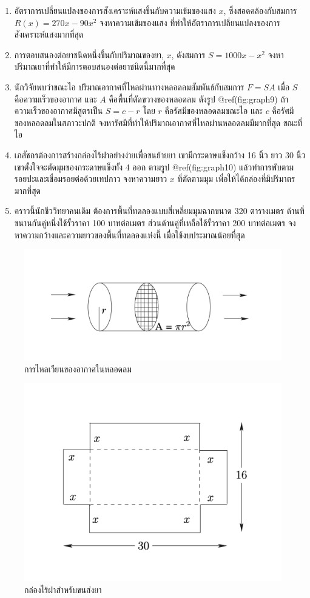 \documentclass[
]{book}
\begin{document}
\begin{enumerate}
\def\labelenumi{\arabic{enumi}.}
\item
  อัตราการเปลี่ยนแปลงของการสังเคราะห์แสงขึ้นกับความเข้มของแสง \(x\),
  ซึ่งสอดคล้องกับสมการ \(R(x)=270x-90x^2\) จงหาความเข้มของแสง
  ที่ทำให้อัตราการเปลี่ยนแปลงของการสังเคราะห์แสงมากที่สุด
\item
  การตอบสนองต่อยาชนิดหนึ่งขึ้นกับปริมาณของยา, \(x\), ดังสมการ \(S=1000x-x^2\)
  จงหาปริมาณยาที่ทำให้มีการตอบสนองต่อยาชนิดนี้มากที่สุด
\item
  นักวิจัยพบว่าขณะไอ ปริมาณอากาศที่ไหลผ่านทางหลอดลมสัมพันธ์กับสมการ \(F=SA\) เมื่อ
  \(S\) คือความเร็วของอากาศ และ \(A\) คือพื้นที่ตัดขวางของหลอดลม ดังรูป
  @ref(fig:graph9) ถ้าความเร็วของอากาศมีสูตรเป็น \(S=c-r\) โดย \(r\)
  คือรัศมีของหลอดลมขณะไอ และ \(c\) คือรัศมีของหลอดลมในสภาวะปกติ
  จงหารัศมีที่ทำให้ปริมาณอากาศที่ไหลผ่านหลอดลมมีมากที่สุด ขณะที่ไอ
\item
  เภสัชกรต้องการสร้างกล่องไร้ฝาอย่างง่ายเพื่อขนย้ายยา เขามีกระดาษแข็งกว้าง 16 นิ้ว ยาว
  30 นิ้ว เขาตั้งใจจะตัดมุมของกระดาษแข็งทั้ง 4 ออก ตามรูป @ref(fig:graph10)
  แล้วทำการพับตามรอยปะและเชื่อมรอยต่อด้วยเทปกาว จงหาความยาว \(x\) ที่ตัดตามมุม
  เพื่อให้ได้กล่องที่มีปริมาตรมากที่สุด
\item
  คราวนี้นักชีววิทยาคนเดิม ต้องการพื้นที่ทดลองแบบสี่เหลี่ยมมุมฉากขนาด 320 ตารางเมตร
  ด้านที่ขนานกันคู่หนึ่งใช้รั้วราคา 100 บาทต่อเมตร ส่วนด้านคู่ที่เหลือใช้รั้วราคา 200
  บาทต่อเมตร จงหาความกว้างและความยาวของพื้นที่ทดลองแห่งนี้ เมื่อใช้งบประมาณน้อยที่สุด
\end{enumerate}

\begin{figure}

{\centering \includegraphics[width=0.5\linewidth]{images/graph9} 

}

\caption{การไหลเวียนของอากาศในหลอดลม}\label{fig:graph9}
\end{figure}

\begin{figure}

{\centering \includegraphics[width=0.5\linewidth]{images/graph10} 

}

\caption{กล่องไร้ฝาสำหรับขนส่งยา}\label{fig:graph10}
\end{figure}
\end{document}
